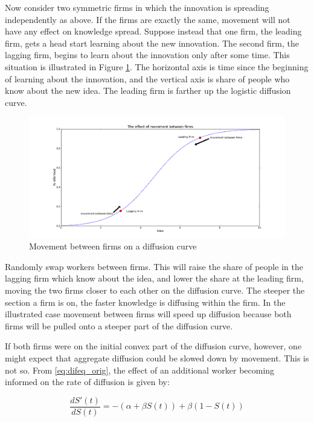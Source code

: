 Now consider two symmetric firms in which the innovation is spreading
independently as above. If the firms are exactly the same, movement will
not have any effect on knowledge spread. Suppose instead that one firm,
the leading firm, gets a head start learning about the new innovation.
The second firm, the lagging firm, begins to learn about the innovation
only after some time. This situation is illustrated in Figure
\ref{fig:simp_dif}. The horizontal axis is time since the beginning of
learning about the innovation, and the vertical axis is share of people
who know about the new idea. The leading firm is farther up the logistic
diffusion curve.

\begin{figure}[!ht]
    \centering
    \includegraphics[scale=0.35]{plots/mean_field_logistic.png}
    \caption{Movement between firms on a diffusion curve}
    \label{fig:simp_dif}
\end{figure}

Randomly swap workers between firms. This will raise the share of people
in the lagging firm which know about the idea, and lower the share at
the leading firm, moving the two firms closer to each other on the
diffusion curve.  The steeper the section a firm is on, the
faster knowledge is diffusing within the firm. In the illustrated case
movement between firms will speed up diffusion because both firms will
be pulled onto a steeper part of the diffusion curve.

If both firms were on the initial convex part of the diffusion curve, however, one might 
expect that aggregate diffusion could be slowed down by movement.\footnotemark{} This is not so.
From \eqref{eq:difeq_orig}, the effect of an additional worker becoming informed on the rate of diffusion is given by:

\begin{equation}
\frac{d S'(t)}{d S(t)} = - \left( \alpha + \beta S(t) \right) + \beta \left(1 - S(t)\right)
\end{equation}

